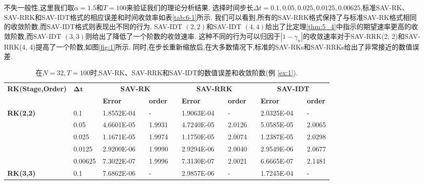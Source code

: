 不失一般性,这里我们取$\alpha=1.5$和$T=100$来验证我们的理论分析结果. 
选择时间步长$\Delta t=0.1,0.05,0.025,0.0125,0.00625$,标准SAV-RK、SAV-RRK和SAV-IDT格式的相应误差和时间收敛率如表\ref{tab:6-1}所示. 
我们可以看到,所有的SAV-RRK格式保持了与标准SAV-RK格式相同的收敛阶数,而SAV-IDT格式则表现出不同的行为. 
SAV-IDT $(2,2)$和SAV-IDT $(4,4)$给出了比定理\ref{thm:5_4}中指示的期望速率更高的收敛阶数,而SAV-IDT $(3,3)$则给出了降低了一个阶数的收敛速率. 
这种不同的行为可以归因于$\left|1-\gamma_n\right|$的收敛速率对于SAV-RRK(2, 2)和SAV-RRK(4, 4)提高了一个阶数,如图\ref{fig:1}所示. 
同时,在步长重新缩放后,在大多数情况下,标准的SAV-RKs和SAV-RRKs给出了非常接近的数值误差.
\begin{table}[H]\footnotesize
	\centering
	\caption{在$N=32, T = 100$时,SAV-RK、SAV-RRK和SAV-IDT的数值误差和收敛阶数(例 \ref{ex:1}).}
	\begin{tabular}{lllllrlrlrlrlrl}
	\toprule
	\multicolumn{2}{l}{\multirow{2}[3]{*}{\textbf{RK(Stage,Order)}}} & \multicolumn{2}{l}{\multirow{2}[3]{*}{$\bm{\Delta t}$}} & \multicolumn{3}{c}{\textbf{SAV-RK}} &       & \multicolumn{3}{c}{\textbf{SAV-RRK}} &       & \multicolumn{3}{c}{\textbf{SAV-IDT}} \\
	\cmidrule{5-7}\cmidrule{9-11}\cmidrule{13-15}    \multicolumn{2}{l}{} & \multicolumn{2}{l}{} & \textbf{Error} &       & \textbf{order} &       & \textbf{Error} &       & \textbf{order} &       & \textbf{Error} &       & \textbf{order} \\
	\multicolumn{2}{l}{\multirow{5}[0]{*}{\textbf{RK(2,2)}}} & \multicolumn{2}{l}{0.1} & 1.8552E-04 &       & -     &       & 1.9063E-04 &       & -     &       & 2.0325E-04 &       & - \\
	\multicolumn{2}{l}{} & \multicolumn{2}{l}{0.05} & 4.6601E-05 &       & 1.9931  &       & 4.7240E-05 &       & 2.0126  &       & 5.0585E-05 &       & 2.0065  \\
	\multicolumn{2}{l}{} & \multicolumn{2}{l}{0.025} & 1.1671E-05 &       & 1.9974  &       & 1.1750E-05 &       & 2.0074  &       & 1.2387E-05 &       & 2.0298  \\
	\multicolumn{2}{l}{} & \multicolumn{2}{l}{0.0125} & 2.9200E-06 &       & 1.9990  &       & 2.9294E-06 &       & 2.0040  &       & 2.9549E-06 &       & 2.0677  \\
	\multicolumn{2}{l}{} & \multicolumn{2}{l}{0.00625} & 7.3022E-07 &       & 1.9996  &       & 7.3130E-07 &       & 2.0021  &       & 6.6665E-07 &       & 2.1481  \\
	\multicolumn{2}{l}{\multirow{5}[0]{*}{\textbf{RK(3,3)}}} & \multicolumn{2}{l}{0.1} & 7.6862E-06 &       & -     &       & 2.9857E-06 &       & -     &       & 1.7245E-04 &       & - \\

\end{tabular}
\end{table}

